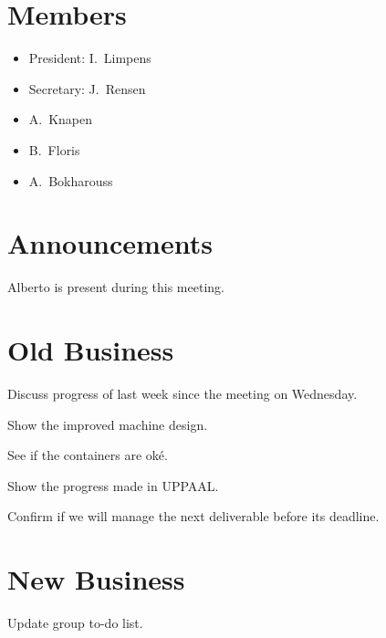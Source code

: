 \section{Members}
\begin{itemize}
	\item President: I.~Limpens
    \item Secretary: J.~Rensen
    \item A.~Knapen
    \item B.~Floris
    \item A.~Bokharouss
\end{itemize}

\section{Announcements}
\begin{items}
	\item Alberto is present during this meeting.
\end{items}


\section{Old Business}
\begin{items}
	\item Discuss progress of last week since the meeting on Wednesday.
    \item Show the improved machine design.
	\item See if the containers are oké.
    \item Show the progress made in UPPAAL.
    \item Confirm if we will manage the next deliverable before its deadline.
\end{items}


\section{New Business}
\begin{items}
    \item Update group to-do list.
\end{items}

\vspace{1em}
